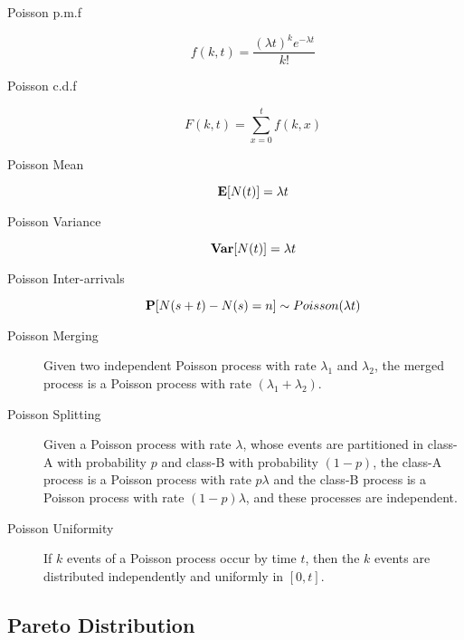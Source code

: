\begin{description}
	
	\item [Poisson p.m.f]	
		\begin{equation}
		f(k,t) = \frac{(\lambda t)^{k} e^{-\lambda t}}{k!}
		\end{equation}
	
	\item [Poisson c.d.f]	
		\begin{equation}
		F(k,t) = \sum_{x=0}^{t} f(k,x)
		\end{equation}
	
	\item [Poisson Mean]	
		\begin{equation}
		\mathbf{E}[N(t)] = \lambda t
		\end{equation}
	
	\item [Poisson Variance]	
		\begin{equation}
		\mathbf{Var}[N(t)] = \lambda t
		\end{equation}
	
	\item [Poisson Inter-arrivals]	
		\begin{equation}
		\mathbf{P}[N(s+t)-N(s) = n] \sim Poisson(\lambda t)
		\end{equation}	
	
	\item [Poisson Merging]
		Given two independent Poisson process with rate $\lambda_{1}$ and $\lambda_{2}$, the merged process is a Poisson process with rate $(\lambda_{1} + \lambda_{2})$.
	
	\item [Poisson Splitting]
		Given a Poisson process with rate $\lambda$, whose events are partitioned in class-A with probability $p$ and class-B with probability $(1-p)$, the class-A process is a Poisson process with rate $p \lambda$ and the class-B process is a Poisson process with rate $(1-p) \lambda$, and these processes are independent.
	
	\item [Poisson Uniformity]
		If $k$ events of a Poisson process occur by time $t$, then the $k$ events are distributed independently and uniformly in $[0,t]$. 
		
\end{description}




\subsection{Pareto Distribution}

